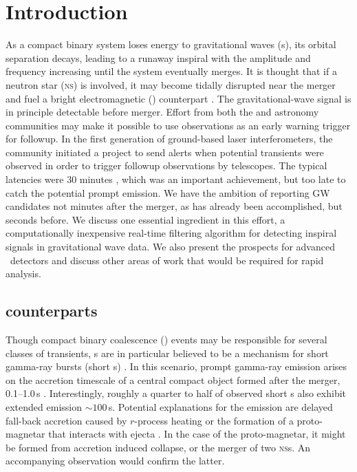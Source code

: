 \section{Introduction}
\label{sec:introduction}

As a compact binary system loses energy to gravitational waves (\GW{}s), its
orbital separation decays, leading to a runaway inspiral with the \GW{}
amplitude and frequency increasing until the system eventually merges.  It is
thought that if a neutron star (\textsc{ns}) is involved, it may become tidally disrupted near
the merger and fuel a bright electromagnetic (\EM{}) counterpart
\citep{shibata:2007}.  The gravitational-wave signal is in principle detectable
before merger.  Effort from both the \GW{} and astronomy communities may make
it possible to use \GW{} observations as an early warning trigger for \EM{}
followup. In the first generation of ground-based laser interferometers, the \GW{}
community initiated a project to send alerts when potential \GW{} transients
were observed in order to trigger followup observations by \EM{} telescopes.
The typical latencies were 30 minutes \citep{HugheyGWPAW2011}, which was an
important achievement, but too late to catch the potential prompt \EM{}
emission. We have the ambition of reporting GW candidates not minutes after
the merger, as has already been accomplished, but seconds before.  We discuss
one essential ingredient in this effort, a computationally inexpensive
real-time filtering algorithm for detecting inspiral signals in gravitational
wave data.  We also present the prospects for advanced \GW\ detectors and
discuss other areas of work that would be required for rapid analysis.

\subsection{\EM{} counterparts}

Though compact binary coalescence (\CBC{}) events may be responsible for
several classes of \EM{} transients, \CBC{}s are in particular believed to be a
mechanism for short gamma-ray bursts (short \GRB{}s) \citep{Lee:2005, nakar07}.
In this scenario, prompt gamma-ray emission arises on the accretion timescale
of a central compact object formed after the merger, 0.1--1.0\,s
\citep{Janka1999}.  Interestingly, roughly a quarter to half of observed short
\GRB{}s
also exhibit extended emission $\sim$$100$\,s.  Potential explanations for the
emission are delayed fall-back accretion \citep{Metzger2010} caused by
$r$-process heating or the formation of a proto-magnetar that interacts with
ejecta \citep{Bucciantini2011}.  In the case of the proto-magnetar, it might be
formed from accretion induced collapse, or the merger of two \textsc{ns}s.  An
accompanying \GW{} observation would confirm the latter.

